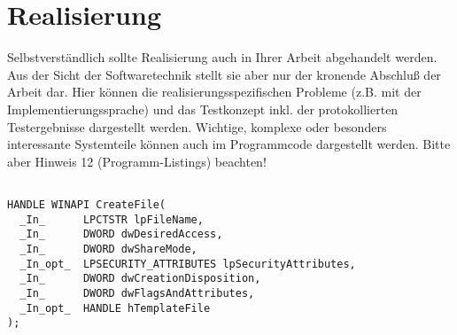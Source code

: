 \chapter{Realisierung}\label{chp:realisierung}
Selbstverständlich sollte Realisierung auch in Ihrer Arbeit abgehandelt werden. Aus der Sicht der Softwaretechnik stellt sie aber nur der kronende Abschluß der Arbeit dar. Hier können die realisierungsspezifischen Probleme (z.B. mit der Implementierungssprache) und das Testkonzept inkl. der protokollierten Testergebnisse dargestellt werden. Wichtige, komplexe oder besonders interessante Systemteile können auch im Programmcode dargestellt werden. Bitte aber Hinweis 12 (Programm-Listings) beachten!


\begin{lstlisting}	

HANDLE WINAPI CreateFile(
  _In_      LPCTSTR lpFileName,
  _In_      DWORD dwDesiredAccess,
  _In_      DWORD dwShareMode,
  _In_opt_  LPSECURITY_ATTRIBUTES lpSecurityAttributes,
  _In_      DWORD dwCreationDisposition,
  _In_      DWORD dwFlagsAndAttributes,
  _In_opt_  HANDLE hTemplateFile
);

\end{lstlisting}
